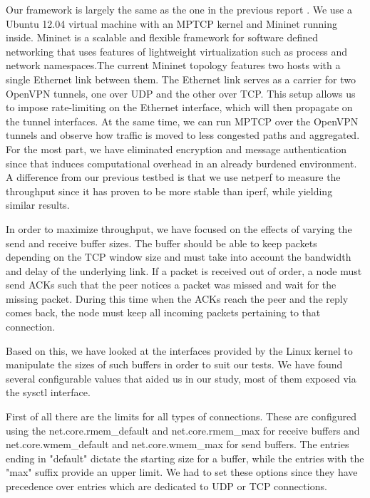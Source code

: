 Our framework is largely the same as the one in the previous report \cite{sem1}. We use a Ubuntu 12.04 virtual machine with an MPTCP kernel and Mininet running inside. Mininet is a scalable and flexible framework for software defined networking that uses features of lightweight virtualization such as process and network namespaces.The current Mininet topology features two hosts with a single Ethernet link between them. The Ethernet link serves as a carrier for two OpenVPN tunnels, one over UDP and
the other over TCP. This setup allows us to impose rate-limiting on the Ethernet
interface, which will then propagate on the tunnel interfaces. At the same
time, we can run MPTCP over the OpenVPN tunnels and observe how traffic is
moved to less congested paths and aggregated. For the most part, we have
eliminated encryption and message authentication since that induces
computational overhead in an already burdened environment. A difference from
our previous testbed is that we use netperf to measure the throughput since it
has proven to be more stable than iperf, while yielding similar results.

In order to maximize throughput, we have focused on the effects of varying the
send and receive buffer sizes. The buffer should be able to keep packets
depending on the TCP window size and must take into account the bandwidth and
delay of the underlying link. If a packet is received out of order, a node
must send ACKs such that the peer notices a packet was missed and wait for the
missing packet. During this time when the ACKs reach the peer and the reply
comes back, the node must keep all incoming packets pertaining to that
connection.

Based on this, we have looked at the interfaces provided by the Linux kernel
to manipulate the sizes of such buffers in order to suit our tests. We have
found several configurable values that aided us in our study, most of them
exposed via the sysctl interface.

First of all there are the limits for all types of connections. These are
configured using the net.core.rmem_default and net.core.rmem_max for receive
buffers and net.core.wmem_default and net.core.wmem_max for send buffers. The
entries ending in "default" dictate the starting size for a buffer, while the
entries with the "max" suffix provide an upper limit. We had to set these
options since they have precedence over entries which are dedicated to UDP or
TCP connections.

